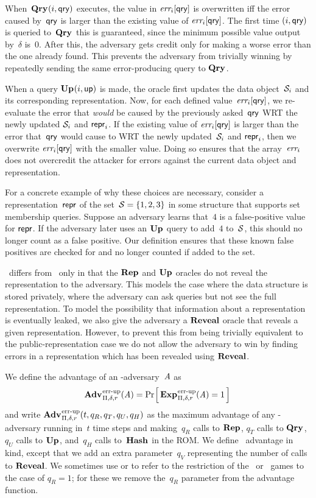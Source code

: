 When~$\textup{\textbf{Qry}}\hspace{0.5pt}(i,\mathsf{qry})$ executes, the value in $\textit{err}_i[\mathsf{qry}]$ is overwritten iff
the error caused by~$\mathsf{qry}$ is larger than the existing value of $\textit{err}_i[\mathsf{qry}]$.
The first time $(i,\mathsf{qry})$ is queried to~$\textup{\textbf{Qry}}\hspace{0.5pt}$ this is guaranteed, since the
minimum possible value output by~$\delta$ is~$0$. After this, the adversary gets
credit only for making a worse error than the one already found. This prevents
the adversary from trivially winning by repeatedly sending the same
error-producing query to $\textup{\textbf{Qry}}\hspace{0.5pt}$.

When a query $\textup{\textbf{Up}}\hspace{0.5pt}(i,\mathsf{up})$ is made, the oracle first updates the data
object~$\mathcal{S}_i$ and its corresponding representation.
%
Now, for each defined value~$\textit{err}_i[\mathsf{qry}]$, we re-evaluate the error that
\emph{would} be caused by the previously asked~$\mathsf{qry}$ WRT the newly updated
$\mathcal{S}_i$ and $\mathsf{repr}_i$. If the existing value of $\textit{err}_i[\mathsf{qry}]$ is larger than
the error that~$\mathsf{qry}$ would cause to WRT the newly updated~$\mathcal{S}_i$ and
$\mathsf{repr}_i$, then we overwrite $\textit{err}_i[\mathsf{qry}]$ with the smaller value.  Doing so
ensures that the array~$\textit{err}_i$ does not overcredit the attacker for errors
against the current data object and representation.

For a concrete example of why these choices are necessary, consider a
representation~$\mathsf{repr}$ of the set~$\mathcal{S} = \{1,2,3\}$ in some structure that
supports set membership queries. Suppose an adversary learns that~$4$ is a
false-positive value for $\mathsf{repr}$. If the adversary later uses an $\textup{\textbf{Up}}\hspace{0.5pt}$ query to
add~$4$ to~$\mathcal{S}$, this should no longer count as a false positive. Our
definition ensures that these known false positives are checked for and no
longer counted if added to the set.

\erreps\ differs from \errep\ only in that the $\textup{\textbf{Rep}}\hspace{0.5pt}$ and $\textup{\textbf{Up}}\hspace{0.5pt}$ oracles do not
reveal the representation to the adversary. This models the case where the data
structure is stored privately, where the adversary can ask queries but not see
the full representation. To model the possibility that information about a
representation is eventually leaked, we also give the adversary a $\mathbf{Reveal}$ oracle
that reveals a given representation. However, to prevent this from being
trivially equivalent to the public-representation case we do not allow the
adversary to win by finding errors in a representation which has been revealed
using $\mathbf{Reveal}$.

We define the advantage of an \errep-adversary~$\mathit{A}$ as
\[\Adv{\errep}_{\struct,\delta,r}(\advA) =
\Prob{\Exp{\errep}_{\struct,\delta,r}(\advA) = 1} \,\]
and write
$\Adv{\errep}_{\struct,\delta,r}(t,q_R,q_T,q_U,q_H)$ as the maximum advantage of
any \errep-adversary running in~$t$ time steps and making~$q_R$ calls to
$\textup{\textbf{Rep}}\hspace{0.5pt}$, $q_T$ calls to $\textup{\textbf{Qry}}\hspace{0.5pt}$, $q_U$ calls to $\textup{\textbf{Up}}\hspace{0.5pt}$, and~$q_H$ calls
to~$\textup{\textbf{Hash}}\hspace{0.5pt}$ in the ROM.
%
We define \erreps\ advantage in kind, except that
we add an extra parameter~$q_V$ representing the number of calls to $\mathbf{Reveal}$. We
sometimes use  or  to refer to the restriction of the \errep\ or
\erreps\ games to the case of $q_R = 1$; for these we remove the~$q_R$ parameter
from the advantage function.

